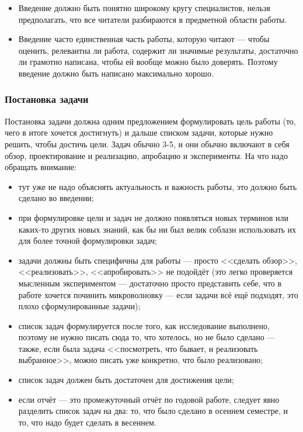 \documentclass{article}
\begin{document}
\begin{itemize}
    \item Введение должно быть понятно широкому кругу специалистов, нельзя предполагать, что все читатели разбираются в предметной области работы.
    \item Введение часто единственная часть работы, которую читают --- чтобы оценить, релевантна ли работа, содержит ли значимые результаты, достаточно ли грамотно написана, чтобы ей вообще можно было доверять. Поэтому введение должно быть написано максимально хорошо.
\end{itemize}

\subsubsection{Постановка задачи}
    
Постановка задачи должна одним предложением формулировать цель работы (то, чего в итоге хочется достигнуть) и дальше списком задачи, которые нужно решить, чтобы достичь цели. Задач обычно 3-5, и они обычно включают в себя обзор, проектирование и реализацию, апробацию и эксперименты. На что надо обращать внимание:

\begin{itemize}
    \item тут уже не надо объяснять актуальность и важность работы, это должно быть сделано во введении;
    \item при формулировке цели и задач не должно появляться новых терминов или каких-то других новых знаний, как бы ни был велик соблазн использовать их для более точной формулировки задач;
    \item задачи должны быть специфичны для работы --- просто <<сделать обзор>>, <<реализовать>>, <<апробировать>> не подойдёт (это легко проверяется мысленным экспериментом --- достаточно просто представить себе, что в работе хочется починить микроволновку --- если задачи всё ещё подходят, это плохо сформулированные задачи);
    \item список задач формулируется после того, как исследование выполнено, поэтому не нужно писать сюда то, что хотелось, но не было сделано --- также, если была задача <<посмотреть, что бывает, и реализовать выбранное>>, можно писать уже конкретно, что было реализовано;
    \item список задач должен быть достаточен для достижения цели;
    \item если отчёт --- это промежуточный отчёт по годовой работе, следует явно разделить список задач на два: то, что было сделано в осеннем семестре, и то, что надо будет сделать в весеннем.
\end{itemize}
\end{document}
